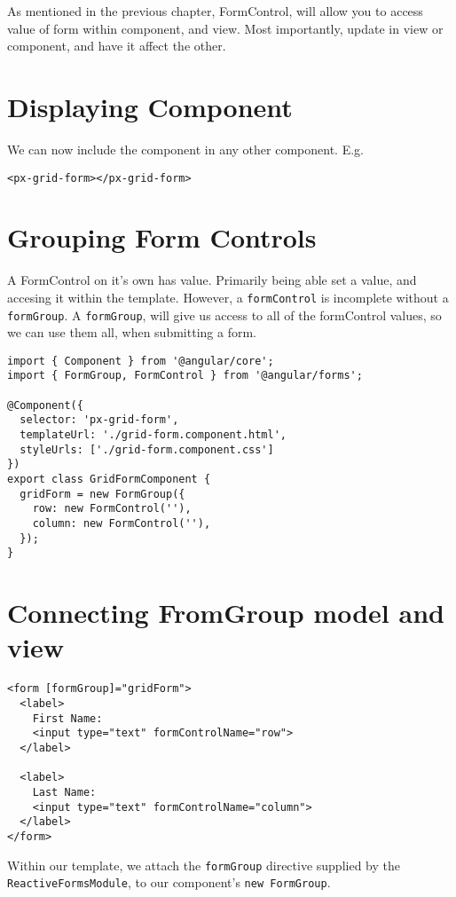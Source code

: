 As mentioned in the previous chapter, FormControl, will allow you to access 
value of form within component, and view. Most importantly, update in view 
or component, and have it affect the other. 

\section{ Displaying Component }
We can now include the component in any other component. E.g. 
\begin{lstlisting}[caption=app.component.html]
<px-grid-form></px-grid-form>  
\end{lstlisting}

\section{ Grouping Form Controls }
A FormControl on it's own has value. Primarily being able set a value, and
accesing it within the template. However, a \lstinline{formControl} is 
incomplete without a \lstinline{formGroup}. A \lstinline{formGroup}, will give us 
access to all of the formControl values, so we can use them all, when 
submitting a form. 

\begin{lstlisting}
import { Component } from '@angular/core';
import { FormGroup, FormControl } from '@angular/forms';
 
@Component({
  selector: 'px-grid-form',
  templateUrl: './grid-form.component.html',
  styleUrls: ['./grid-form.component.css']
})
export class GridFormComponent {
  gridForm = new FormGroup({
    row: new FormControl(''),
    column: new FormControl(''),
  });
}
\end{lstlisting}

\section{ Connecting FromGroup model and view }
\begin{lstlisting}
<form [formGroup]="gridForm">
  <label>
    First Name:
    <input type="text" formControlName="row">
  </label>

  <label>
    Last Name:
    <input type="text" formControlName="column">
  </label>
</form>
\end{lstlisting}
Within our template, we attach the \lstinline{formGroup} directive supplied by
the \lstinline{ReactiveFormsModule}, to our component's \lstinline{new FormGroup}.

